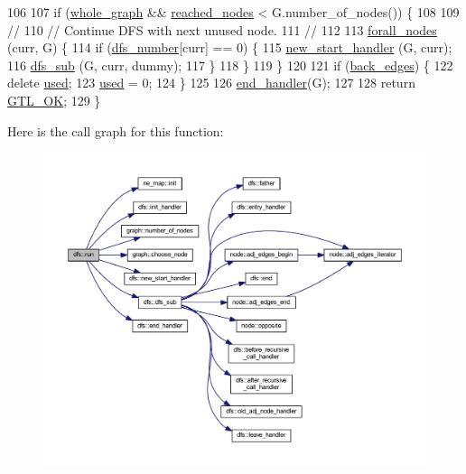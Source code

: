 \begin{DoxyCode}
106 
107     \textcolor{keywordflow}{if} (\mbox{\hyperlink{classdfs_ab8342c80ab208ef0e0d781f0769d0d95}{whole\_graph}} && \mbox{\hyperlink{classdfs_acb11186a1a2a2a1f38cdc0674340ba37}{reached\_nodes}} < G.number\_of\_nodes()) \{
108 
109     \textcolor{comment}{//}
110     \textcolor{comment}{// Continue DFS with next unused node.}
111     \textcolor{comment}{//}
112 
113     \mbox{\hyperlink{graph_8h_a1905bf4c6aa7167b9ee5a2e72f12ad2d}{forall\_nodes}} (curr, G) \{
114         \textcolor{keywordflow}{if} (\mbox{\hyperlink{classdfs_a99727f2274d6af63daae4f0518f3adbe}{dfs\_number}}[curr] == 0) \{
115         \mbox{\hyperlink{classdfs_a304b14458fb78f9feb3d8d5683d3cab5}{new\_start\_handler}} (G, curr);
116         \mbox{\hyperlink{classdfs_ad10b710339b289a61723aef52fbcb5b4}{dfs\_sub}} (G, curr, dummy);
117         \}
118     \}
119     \}    
120     
121     \textcolor{keywordflow}{if} (\mbox{\hyperlink{classdfs_a1dc18a7df8d6b238d5301c92fc7540fa}{back\_edges}}) \{
122     \textcolor{keyword}{delete} \mbox{\hyperlink{classdfs_afc18288747491be301d6d8d85d8f220b}{used}};
123     \mbox{\hyperlink{classdfs_afc18288747491be301d6d8d85d8f220b}{used}} = 0;
124     \}
125 
126     \mbox{\hyperlink{classdfs_a59c512fa99ad3809db3e24347ab43b85}{end\_handler}}(G);
127 
128     \textcolor{keywordflow}{return} \mbox{\hyperlink{classalgorithm_af1a0078e153aa99c24f9bdf0d97f6710a5114c20e4a96a76b5de9f28bf15e282b}{GTL\_OK}};
129 \}    
\end{DoxyCode}
Here is the call graph for this function\+:
\nopagebreak
\begin{figure}[H]
\begin{center}
\leavevmode
\includegraphics[width=350pt]{classdfs_af0863b8974d5fd58cd0375c78ed8163b_cgraph}
\end{center}
\end{figure}
